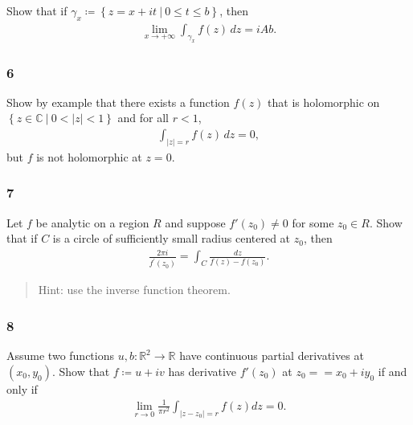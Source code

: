 Show that if
\(\gamma_x \coloneqq\left\{{z = x+it {~\mathrel{\Big|}~}0 \leq t \leq b}\right\}\),
then
\begin{align*}
\lim_{x\to +\infty} \int_{\gamma_x} f(z) \,dz = iAb
.\end{align*}

\hypertarget{section-48}{%
\subsubsection{6}\label{section-48}}

Show by example that there exists a function \(f(z)\) that is
holomorphic on
\(\left\{{z\in {\mathbb{C}}{~\mathrel{\Big|}~}0 < {\left\lvert {z} \right\rvert} < 1}\right\}\)
and for all \(r<1\),
\begin{align*}
\int_{{\left\lvert {z} \right\rvert} = r} f(z) \, dz = 0
,\end{align*}
but \(f\) is not holomorphic at \(z=0\).

\hypertarget{section-49}{%
\subsubsection{7}\label{section-49}}

Let \(f\) be analytic on a region \(R\) and suppose \(f'(z_0) \neq 0\)
for some \(z_0 \in R\). Show that if \(C\) is a circle of sufficiently
small radius centered at \(z_0\), then
\begin{align*}
\frac{2 \pi i}{f^{\prime}\left(z_{0}\right)}=\int_{C} \frac{d z}{f(z)-f\left(z_{0}\right)}
.\end{align*}

\begin{quote}
Hint: use the inverse function theorem.
\end{quote}

\hypertarget{section-50}{%
\subsubsection{8}\label{section-50}}

Assume two functions \(u, b: {\mathbb{R}}^2 \to {\mathbb{R}}\) have
continuous partial derivatives at \((x_0 ,y_0)\). Show that
\(f \coloneqq u + iv\) has derivative \(f'(z_0)\) at
\(z_0 = =x_0 + iy_0\) if and only if
\begin{align*}
\lim _{r \rightarrow 0} \frac{1}{\pi r^{2}} \int_{\left|z-z_{0}\right|=r} f(z) d z=0
.\end{align*}

